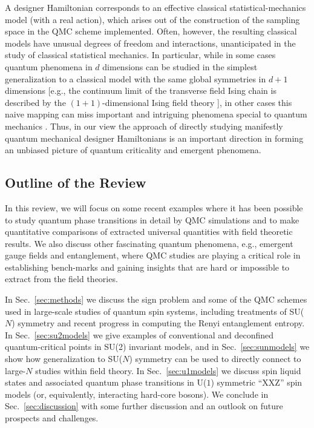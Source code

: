 \documentclass[range]{ar2e}
\begin{document}
A designer Hamiltonian corresponds to an effective classical statistical-mechanics model (with a real action), which arises out of the construction of the sampling 
space in the QMC scheme implemented. Often, however, the resulting classical models have unusual degrees of freedom and interactions, unanticipated in the study 
of classical statistical mechanics. In particular, while in some cases quantum phenomena in $d$ dimensions can be studied in the simplest generalization to a 
classical model with the same global symmetries in $d+1$ dimensions \cite{Rieger94,Sorensen92,Nahum11} [e.g., the continuum limit of the transverse field 
Ising chain is described by the $(1+1)$-dimensional Ising field theory \cite{Sachdev11}], in other cases this naive mapping can miss important and intriguing 
phenomena special to quantum mechanics \cite{Senthil04a,Fradkin04,Sachdev08}. Thus, in our view the approach of directly studying manifestly quantum mechanical 
designer Hamiltonians is an important direction in forming an unbiased picture of quantum criticality and emergent phenomena.

\subsection{Outline of the Review}

In this review, we will focus on some recent examples where it has been possible to study quantum phase transitions in detail 
by QMC simulations and to make quantitative comparisons of extracted universal quantities with field theoretic results. We also discuss other fascinating quantum phenomena, e.g., emergent gauge fields and entanglement, where QMC studies are
playing a critical role in establishing bench-marks and gaining insights that are hard or impossible to extract from the field theories.

In Sec.~\ref{sec:methods} we discuss the sign problem and some of the QMC schemes used in large-scale studies of quantum spin systems, 
including treatments of SU($N$) symmetry and recent progress in computing the Renyi entanglement entropy. In Sec.~\ref{sec:su2models} 
we give examples of conventional and deconfined quantum-critical points in SU(2) invariant models, and in Sec.~\ref{sec:sunmodels} 
we show how generalization to SU($N$) symmetry can be used to directly connect to large-$N$ studies within field theory. In Sec.~\ref{sec:u1models} 
we discuss spin liquid states and associated quantum phase transitions in U($1$) symmetric ``XXZ'' spin models (or, equivalently, interacting hard-core 
bosons). We conclude in Sec.~\ref{sec:discussion} with some further discussion and an outlook on future prospects and challenges.
\end{document}
